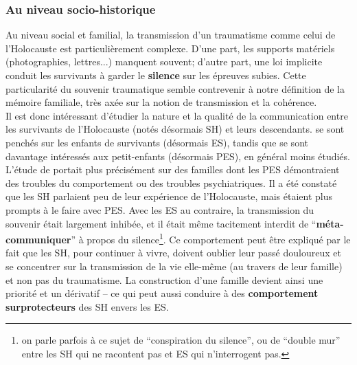 \documentclass[french]{article}
\begin{document}
		\subsubsection{Au niveau socio-historique}
			Au niveau social et familial, la transmission d'un traumatisme comme celui de l'Holocauste est particulièrement complexe. D'une part, les supports matériels (photographies, lettres...) manquent souvent; d'autre part, une loi implicite conduit les survivants à garder le \textbf{silence} sur les épreuves subies. Cette particularité du souvenir traumatique semble contrevenir à notre définition de la mémoire familiale, très axée sur la notion de transmission et la cohérence.\\
			
			Il est donc intéressant d'étudier la nature et la qualité de la communication entre les survivants de l'Holocauste (notés désormais SH) et leurs descendants. \cite{wiseman2006} se sont penchés sur les enfants de survivants (désormais ES), tandis que \cite{fossion2003} se sont davantage intéressés aux petit-enfants (désormais PES), en général moins étudiés. L'étude de \cite{fossion2003} portait plus précisément sur des familles dont les PES démontraient des troubles du comportement ou des troubles psychiatriques. Il a été constaté que les SH parlaient peu de leur expérience de l'Holocauste, mais étaient plus prompts à le faire avec PES. Avec les ES au contraire, la transmission du souvenir était largement inhibée, et il était même tacitement interdit de ``\textbf{méta-communiquer}'' à propos du silence\footnote{on parle parfois à ce sujet de ``conspiration du silence'', ou de ``double mur'' entre les SH qui ne racontent pas et ES qui n'interrogent pas.}. Ce comportement peut être expliqué par le fait que les SH, pour continuer à vivre, doivent oublier leur passé douloureux et se concentrer sur la transmission de la vie elle-même (au travers de leur famille) et non pas du traumatisme. La construction d'une famille devient ainsi une priorité et un dérivatif -- ce qui peut aussi conduire à des \textbf{comportement surprotecteurs} des SH envers les ES.\\
			
\end{document}
